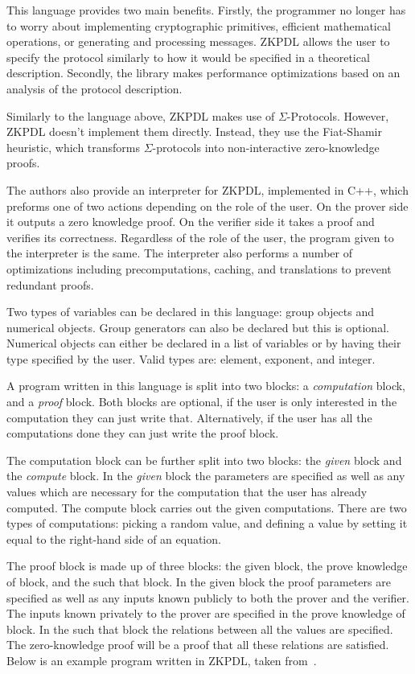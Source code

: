 \documentclass{sig-alternate}
\begin{document}
		This language provides two main benefits. Firstly, the programmer no longer 
		has to worry about implementing cryptographic primitives, efficient mathematical
		operations, or generating and processing messages. ZKPDL allows the user to
		specify the protocol similarly to how it would be specified in a theoretical
		description. Secondly, the library makes performance optimizations based on an
		analysis of the protocol description. 
		
		Similarly to the language above, ZKPDL makes use of $\Sigma$-Protocols.
		However, ZKPDL doesn't implement them directly. Instead, they use the 
		Fiat-Shamir heuristic, which transforms $\Sigma$-protocols into non-interactive
		zero-knowledge proofs.
		
		The authors also provide an interpreter for ZKPDL, implemented in C++, which
		preforms one of two actions depending on the role of the user. On the prover
		side it outputs a zero knowledge proof. On the verifier side it takes a proof
		and verifies its correctness. Regardless of the role of the user, the program
		given to the interpreter is the same. The interpreter also performs a number of
		optimizations including precomputations, caching, and translations to prevent
		redundant proofs. 

		Two types of variables can be declared in this language: group objects
		and numerical objects. Group generators can also be declared but this 
		is optional. Numerical objects can either be declared in a list of variables
		or by having their type specified by the user. Valid types are: element,
		exponent, and integer.
		
		A program written in this language is split into two blocks: a \textit{computation} block,
		and a \textit{proof} block. Both blocks are optional, if the user is only interested in the
		computation they can just write that. Alternatively, if the user has all the computations
		done they can just write the proof block. 
		
		The computation block can be further split into two blocks: the \textit{given} block
		and the \textit{compute} block. In the \textit{given} block the parameters are specified
		as well as any values which are necessary for the computation that the user has already
		computed. The compute block carries out the given computations. There are two
		types of computations: picking a random value, and defining a value by setting it
		equal to the right-hand side of an equation.
		
		The proof block is made up of three blocks: the given block, the 
		prove knowledge of block, and the such that block. In the
		given block the proof parameters are specified as well as any inputs
		known publicly to both the prover and the verifier. The inputs known privately to
		the prover are specified in the prove knowledge of block. In the 
		such that block the relations between all the values are specified.
		The zero-knowledge proof will be a proof that all these relations are satisfied.
		Below is an example program written in ZKPDL, taken from~\cite{ZKPDL:2010}.
		
\end{document}

